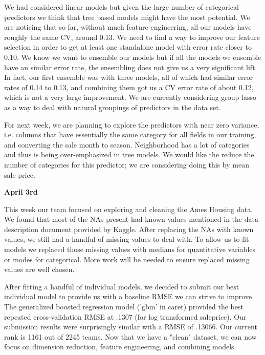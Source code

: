 \documentclass[12pt]{article}
\begin{document}
We had considered linear models but given the large number of categorical predictors we think that tree based models might have the most potential.  We are noticing that so far, without much feature engineering, all our models have roughly the same CV, around 0.13.  We need to find a way to improve our feature selection in order to get at least one standalone model with error rate closer to 0.10.  We know we want to ensemble our models but if all the models we ensemble have an similar error rate, the ensembling does not give us a very significant lift.  In fact, our first ensemble was with three models, all of which had similar error rates of 0.14 to 0.13, and combining them got us a CV error rate of about 0.12, which is not a very large improvement.  We are currently considering group lasso as a way to deal with natural groupings of predictors in the data set.

For next week, we are planning to explore the predictors with near zero variance, i.e. columns that have essentially the same category for all fields in our training, and converting the sale month to season.  Neighborhood has a lot of categories and thus is being over-emphasized in tree models.  We would like the reduce the number of categories for this predictor; we are considering doing this by mean sale price.


\textbf{April 3rd}

This week our team focused on exploring and cleaning the Ames Housing data. We found that most of the NAs present had known values mentioned in the data description document provided by Kaggle. After replacing the NAs with known values, we still had a handful of missing values to deal with. To allow us to fit models we replaced those missing values with medians for quantitative variables or modes for categorical. More work will be needed to ensure replaced missing values are well chosen.

After fitting a handful of individual models, we decided to submit our best individual model to provide us with a baseline RMSE we can strive to improve. The generalized boosted regression model ('gbm' in caret) provided the best repeated cross-validation RMSE at .1307 (for log transformed saleprice). Our submission results were surprisingly similar with a RMSE of .13066. Our current rank is 1161 out of 2245 teams. Now that we have a "clean" dataset, we can now focus on dimension reduction, feature engineering, and combining models.
\end{document}

